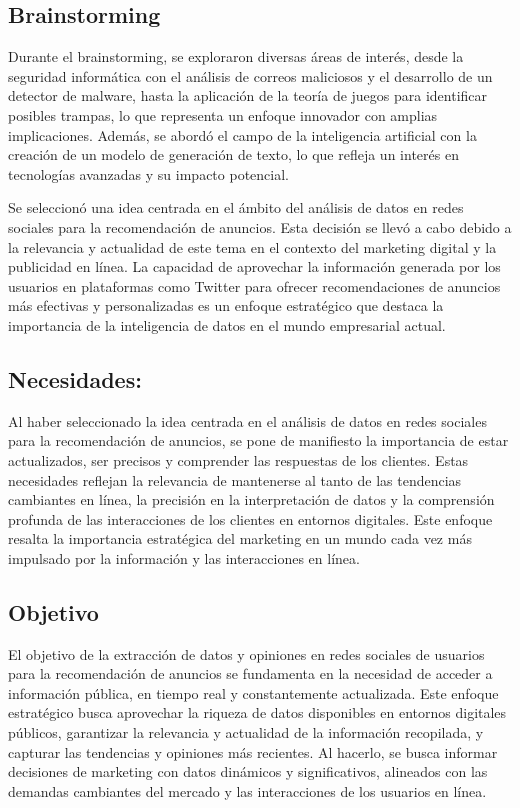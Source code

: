 \documentclass[
  letterpaper,
  DIV=11,
  numbers=noendperiod]{scrartcl}
\begin{document}
\subsection{Brainstorming}\label{brainstorming}

Durante el brainstorming, se exploraron diversas áreas de interés, desde
la seguridad informática con el análisis de correos maliciosos y el
desarrollo de un detector de malware, hasta la aplicación de la teoría
de juegos para identificar posibles trampas, lo que representa un
enfoque innovador con amplias implicaciones. Además, se abordó el campo
de la inteligencia artificial con la creación de un modelo de generación
de texto, lo que refleja un interés en tecnologías avanzadas y su
impacto potencial.

Se seleccionó una idea centrada en el ámbito del análisis de datos en
redes sociales para la recomendación de anuncios. Esta decisión se llevó
a cabo debido a la relevancia y actualidad de este tema en el contexto
del marketing digital y la publicidad en línea. La capacidad de
aprovechar la información generada por los usuarios en plataformas como
Twitter para ofrecer recomendaciones de anuncios más efectivas y
personalizadas es un enfoque estratégico que destaca la importancia de
la inteligencia de datos en el mundo empresarial actual.

\subsection{Necesidades:}\label{necesidades}

Al haber seleccionado la idea centrada en el análisis de datos en redes
sociales para la recomendación de anuncios, se pone de manifiesto la
importancia de estar actualizados, ser precisos y comprender las
respuestas de los clientes. Estas necesidades reflejan la relevancia de
mantenerse al tanto de las tendencias cambiantes en línea, la precisión
en la interpretación de datos y la comprensión profunda de las
interacciones de los clientes en entornos digitales. Este enfoque
resalta la importancia estratégica del marketing en un mundo cada vez
más impulsado por la información y las interacciones en línea.

\subsection{Objetivo}\label{objetivo}

El objetivo de la extracción de datos y opiniones en redes sociales de
usuarios para la recomendación de anuncios se fundamenta en la necesidad
de acceder a información pública, en tiempo real y constantemente
actualizada. Este enfoque estratégico busca aprovechar la riqueza de
datos disponibles en entornos digitales públicos, garantizar la
relevancia y actualidad de la información recopilada, y capturar las
tendencias y opiniones más recientes. Al hacerlo, se busca informar
decisiones de marketing con datos dinámicos y significativos, alineados
con las demandas cambiantes del mercado y las interacciones de los
usuarios en línea.
\end{document}
